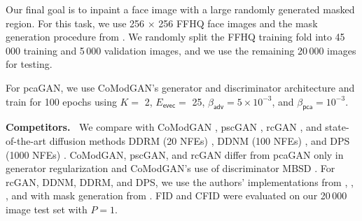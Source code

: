 \documentclass{article}
\theoremstyle{plain}
\theoremstyle{definition}
\theoremstyle{remark}
\newcommand{\evec}{_{\mathsf{evec}}}
\newcommand{\betaadv}{\beta_{\mathsf{adv}}}
\newcommand{\betapca}{\beta_{\mathsf{pca}}}
\begin{document}
\begin{table}[t]
  \caption{Average FFHQ inpainting results.}
  \label{tab:inpainting256}
  \centering
\end{table}

Our final goal is to inpaint a face image with a large randomly generated masked region.
For this task, we use 256 $\times$ 256 FFHQ face images \cite{Karras:CVPR:19} and the mask generation procedure from \cite{Zhao:ICLR:21}.
We randomly split the FFHQ training fold into 45\,000 training and 5\,000 validation images, and we use the remaining 20\,000 images for testing. 
 
For pcaGAN, we use CoModGAN's \cite{Zhao:ICLR:21} generator and discriminator architecture
and train for 100 epochs using $K=$ 2, $E\evec=$ 25, $\betaadv=5\times 10^{-3}$, and $\betapca=10^{-3}$.

\textbf{Competitors.~} 
We compare with 
CoModGAN \cite{Zhao:ICLR:21}, pscGAN \cite{Ohayon:ICCVW:21},
rcGAN \cite{Bendel:NIPS:23}, 
and state-of-the-art diffusion methods DDRM (20 NFEs) \cite{Kawar:NIPS:22}, DDNM (100 NFEs) \cite{Wang:ICLR:23}, and DPS (1000 NFEs) \cite{Chung:ICLR:23}.
CoModGAN, pscGAN, and rcGAN differ from pcaGAN only in generator regularization and CoModGAN's use of discriminator MBSD \cite{Karras:ICLR:18}.
For rcGAN, DDNM, DDRM, and DPS, we use the authors' implementations from \cite{Bendel:github:23}, \cite{Wang:github:23}, \cite{Kawar:github:22}, and \cite{Chung:github:23} with mask generation from \cite{Zhao:ICLR:21}.
%
FID and CFID were evaluated on our 20\,000 image test set with $P\!=\!1$.
\end{document}
